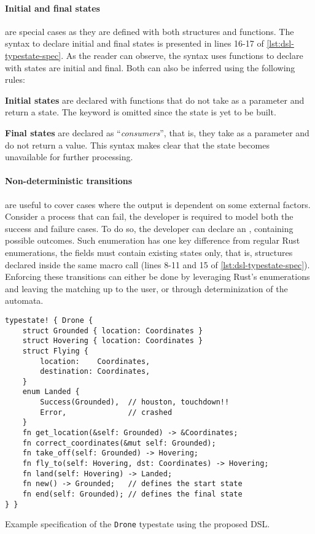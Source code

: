 \paragraph{Initial and final states} are special cases as they are defined with both structures and functions.
The syntax to declare initial and final states is presented in lines 16-17 of \autoref{lst:dsl-typestate-spec}.
As the reader can observe, the syntax uses functions to declare with states are initial and final.
Both can also be inferred using the following rules:
\begin{compactitem}
    \item \textbf{Initial states} are declared with functions that do not take  as a parameter and return a state.
    The  keyword is omitted since the state is yet to be built.
    \item \textbf{Final states} are declared as “\emph{consumers}”, that is, they take  as a parameter and do not return a value.
    This syntax makes clear that the state becomes unavailable for further processing.
\end{compactitem}

\paragraph{Non-deterministic transitions} are useful to cover cases where the output is dependent on some external factors.
Consider a process that can fail, the developer is required to model both the success and failure cases.
To do so, the developer can declare an , containing possible outcomes.
Such enumeration has one key difference from regular Rust enumerations, the fields must contain existing states only,
that is, structures declared inside the same macro call (lines 8-11 and 15 of \autoref{lst:dsl-typestate-spec}).
Enforcing these transitions can either be done by leveraging Rust's enumerations and leaving the matching up to the user,
or through determinization of the automata.

\begin{listing}
    \centering
    \begin{verbatim}
typestate! { Drone {
    struct Grounded { location: Coordinates }
    struct Hovering { location: Coordinates }
    struct Flying {
        location:    Coordinates,
        destination: Coordinates,
    }
    enum Landed {
        Success(Grounded),  // houston, touchdown!!
        Error,              // crashed
    }
    fn get_location(&self: Grounded) -> &Coordinates;
    fn correct_coordinates(&mut self: Grounded);
    fn take_off(self: Grounded) -> Hovering;
    fn fly_to(self: Hovering, dst: Coordinates) -> Hovering;
    fn land(self: Hovering) -> Landed;
    fn new() -> Grounded;   // defines the start state
    fn end(self: Grounded); // defines the final state
} }
    \end{verbatim}
    \caption{
        Example specification of the \texttt{Drone} typestate using the proposed DSL.
    }
    \label{lst:dsl-typestate-spec}
\end{listing}


